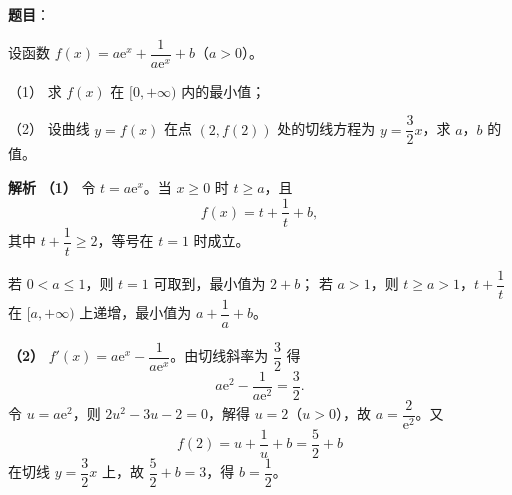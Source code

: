 \begin{answer}

\textbf{题目}：

设函数 $f(x)=a\mathrm e^x+\dfrac1{a\mathrm e^x}+b$（$a>0$）。

（1） 求 $f(x)$ 在 $[0,+\infty)$ 内的最小值；

（2） 设曲线 $y=f(x)$ 在点 $(2,f(2))$ 处的切线方程为 $y=\dfrac32x$，求 $a$，$b$ 的值。

\textbf{解析}
\textbf{（1）} 令 $t=a\mathrm e^x$。当 $x\geqslant0$ 时 $t\geqslant a$，且
\nopagebreak[4]
\[f(x)=t+\frac1t+b,\]
其中 $t+\dfrac1t\geqslant2$，等号在 $t=1$ 时成立。

若 $0<a\leqslant1$，则 $t=1$ 可取到，最小值为 $2+b$；
若 $a>1$，则 $t\geqslant a>1$，$t+\dfrac1t$ 在 $[a,+\infty)$ 上递增，最小值为 $a+\dfrac1a+b$。

\textbf{（2）} $f'(x)=a\mathrm e^x-\dfrac1{a\mathrm e^x}$。由切线斜率为 $\dfrac32$ 得
\nopagebreak[4]
\[a\mathrm e^2-\frac1{a\mathrm e^2}=\frac32.\]
令 $u=a\mathrm e^2$，则 $2u^2-3u-2=0$，解得 $u=2$（$u>0$），故 $a=\dfrac2{\mathrm e^2}$。又
\nopagebreak[4]
\[f(2)=u+\frac1u+b=\frac52+b\]
在切线 $y=\dfrac32x$ 上，故 $\dfrac52+b=3$，得 $b=\dfrac12$。



\end{answer}

